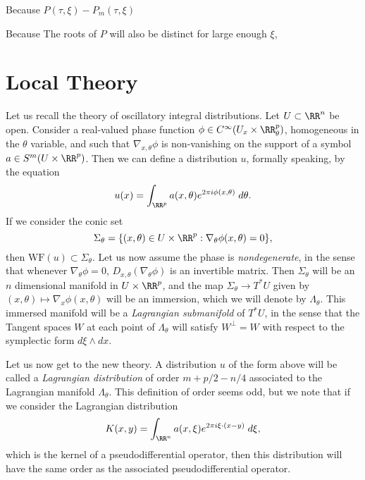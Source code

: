 Because $P(\tau,\xi) - P_m(\tau,\xi)$

Because The roots of $P$ will also be distinct for large enough $\xi$, 

\section{Local Theory}

Let us recall the theory of oscillatory integral distributions. Let $U \subset \RR^n$ be open. Consider a real-valued phase function $\phi \in C^\infty(U_x \times \RR^p_\theta)$, homogeneous in the $\theta$ variable, and such that $\nabla_{x,\theta} \phi$ is non-vanishing on the support of a symbol $a \in S^m(U \times \RR^p)$. Then we can define a distribution $u$, formally speaking, by the equation
%
\[ u(x) = \int_{\RR^p} a(x,\theta) e^{2 \pi i \phi(x,\theta)}\; d\theta. \]
%
If we consider the conic set
%
\[ \Sigma_\theta = \{ (x,\theta) \in U \times \RR^p : \nabla_\theta \phi(x,\theta) = 0 \}, \]
%
then $\text{WF}(u) \subset \Sigma_\theta$. Let us now assume the phase is \emph{nondegenerate}, in the sense that whenever $\nabla_\theta \phi = 0$, $D_{x,\theta} (\nabla_\theta \phi)$ is an invertible matrix. Then $\Sigma_\theta$ will be an $n$ dimensional manifold in $U \times \RR^p$, and the map $\Sigma_\theta \to T^* U$ given by $(x,\theta) \mapsto \nabla_x \phi(x,\theta)$ will be an immersion, which we will denote by $\Lambda_\theta$. This immersed manifold will be a \emph{Lagrangian submanifold} of $T^* U$, in the sense that the Tangent spaces $W$ at each point of $\Lambda_\theta$ will satisfy $W^\perp = W$ with respect to the symplectic form $d\xi \wedge dx$.

Let us now get to the new theory. A distribution $u$ of the form above will be called a \emph{Lagrangian distribution} of order $m + p/2 - n/4$ associated to the Lagrangian manifold $\Lambda_\theta$. This definition of order seems odd, but we note that if we consider the Lagrangian distribution
%
\[ K(x,y) = \int_{\RR^n} a(x,\xi) e^{2 \pi i \xi \cdot (x - y)}\; d\xi, \]
%
which is the kernel of a pseudodifferential operator, then this distribution will have the same order as the associated pseudodifferential operator.














